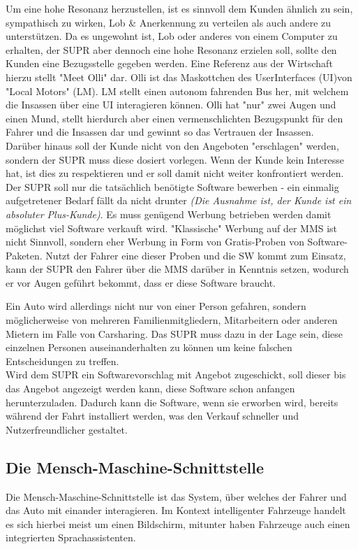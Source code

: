 Um eine hohe Resonanz herzustellen, ist es sinnvoll dem Kunden ähnlich zu sein, sympathisch zu wirken, Lob \& Anerkennung zu verteilen als auch andere zu unterstützen. Da es ungewohnt ist, Lob oder anderes von einem Computer zu erhalten, der SUPR aber dennoch eine hohe Resonanz erzielen soll, sollte den Kunden eine Bezugsstelle gegeben werden. Eine Referenz aus der Wirtschaft hierzu stellt "Meet Olli" dar\cite{meetolli}. Olli ist das Maskottchen des UserInterfaces (UI)von "Local Motors" (LM). LM stellt einen autonom fahrenden Bus her, mit welchem die Insassen über eine UI interagieren können. Olli hat "nur" zwei Augen und einen Mund, stellt hierdurch aber einen vermenschlichten Bezugspunkt für den Fahrer und die Insassen dar und gewinnt so das Vertrauen der Insassen. \\

Darüber hinaus soll der Kunde nicht von den Angeboten "erschlagen" werden, sondern der SUPR muss diese dosiert vorlegen. Wenn der Kunde kein Interesse hat, ist dies zu respektieren und er soll damit nicht weiter konfrontiert werden. Der SUPR soll nur die tatsächlich benötigte Software bewerben - ein einmalig aufgetretener Bedarf fällt da nicht drunter \textit{(Die Ausnahme ist, der Kunde ist ein absoluter Plus-Kunde)}. Es muss genügend Werbung betrieben werden damit möglichst viel Software verkauft wird. "Klassische" Werbung auf der MMS ist nicht Sinnvoll, sondern eher Werbung in Form von Gratis-Proben von Software-Paketen. Nutzt der Fahrer eine dieser Proben und die SW kommt zum Einsatz, kann der SUPR den Fahrer über die MMS darüber in Kenntnis setzen, wodurch er vor Augen geführt bekommt, dass er diese Software braucht.

Ein Auto wird allerdings nicht nur von einer Person gefahren, sondern möglicherweise von mehreren Familienmitgliedern, Mitarbeitern oder anderen Mietern im Falle von Carsharing. Das SUPR muss dazu in der Lage sein, diese einzelnen Personen auseinanderhalten zu können um keine falschen Entscheidungen zu treffen.\\

Wird dem SUPR ein Softwarevorschlag mit Angebot zugeschickt, soll dieser bis das Angebot angezeigt werden kann, diese Software schon anfangen herunterzuladen. Dadurch kann die Software, wenn sie erworben wird, bereits während der Fahrt installiert werden, was den Verkauf schneller und Nutzerfreundlicher gestaltet.
\subsection{Die Mensch-Maschine-Schnittstelle}\label{MMS}
Die Mensch-Maschine-Schnittstelle ist das System, über welches der Fahrer und das Auto mit einander interagieren. Im Kontext intelligenter Fahrzeuge handelt es sich hierbei meist um einen Bildschirm, mitunter haben Fahrzeuge auch einen integrierten Sprachassistenten.\\

